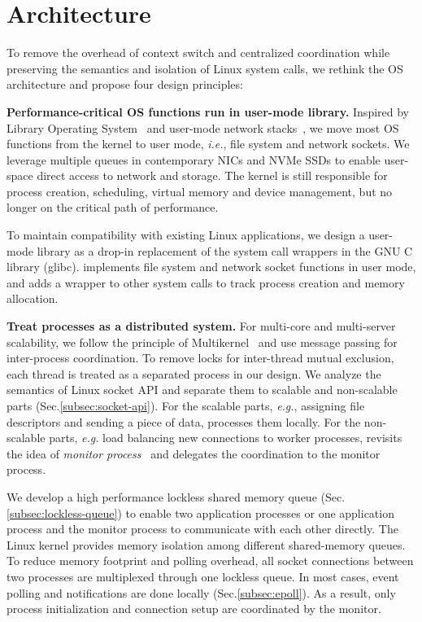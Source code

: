 \section{Architecture}
\label{sec:architecture}

To remove the overhead of context switch and centralized coordination while preserving the semantics and isolation of Linux system calls, we rethink the OS architecture and propose four design principles:

\textbf{Performance-critical OS functions run in user-mode library.}
Inspired by Library Operating System~ and user-mode network stacks~, we move most OS functions from the kernel to user mode, \textit{i.e.}, file system and network sockets. We leverage multiple queues in contemporary NICs and NVMe SSDs to enable user-space direct access to network and storage. The kernel is still responsible for process creation, scheduling, virtual memory and device management, but no longer on the critical path of performance.

To maintain compatibility with existing Linux applications, we design a user-mode library \libipc as a drop-in replacement of the system call wrappers in the GNU C library (glibc). \libipc implements file system and network socket functions in user mode, and adds a wrapper to other system calls to track process creation and memory allocation.

\textbf{Treat processes as a distributed system.}
For multi-core and multi-server scalability, we follow the principle of Multikernel~\cite{baumann2009multikernel} and use message passing for inter-process coordination. To remove locks for inter-thread mutual exclusion, each thread is treated as a separated process in our design. We analyze the semantics of Linux socket API and separate them to scalable and non-scalable parts (Sec.\ref{subsec:socket-api}). For the scalable parts, \textit{e.g.}, assigning file descriptors and sending a piece of data, \libipc processes them locally. For the non-scalable parts, \textit{e.g.} load balancing new connections to worker processes, \libipc revisits the idea of \textit{monitor process}~\cite{hoare1974monitors} and delegates the coordination to the monitor process.

We develop a high performance lockless shared memory queue (Sec.\ref{subsec:lockless-queue}) to enable two application processes or one application process and the monitor process to communicate with each other directly. The Linux kernel provides memory isolation among different shared-memory queues. To reduce memory footprint and polling overhead, all socket connections between two processes are multiplexed through one lockless queue. In most cases, event polling and notifications are done locally (Sec.\ref{subsec:epoll}). As a result, only process initialization and connection setup are coordinated by the monitor.

